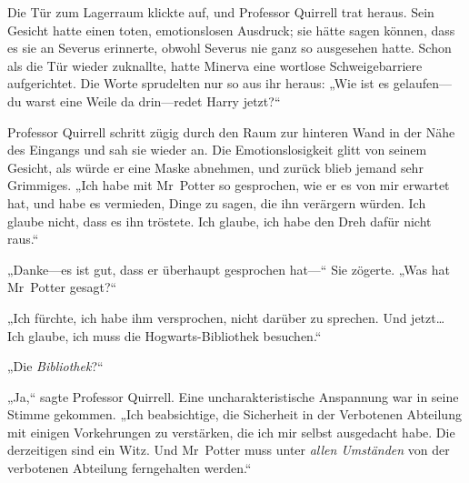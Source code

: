 \later


Die Tür zum Lagerraum klickte auf, und Professor Quirrell trat heraus. Sein Gesicht hatte einen toten, emotionslosen Ausdruck; sie hätte sagen können, dass es sie an Severus erinnerte, obwohl Severus nie ganz so ausgesehen hatte. Schon als die Tür wieder zuknallte, hatte Minerva eine wortlose Schweigebarriere aufgerichtet. Die Worte sprudelten nur so aus ihr heraus: „Wie ist es gelaufen—du warst eine Weile da drin—redet Harry jetzt?“

Professor Quirrell schritt zügig durch den Raum zur hinteren Wand in der Nähe des Eingangs und sah sie wieder an. Die Emotionslosigkeit glitt von seinem Gesicht, als würde er eine Maske abnehmen, und zurück blieb jemand sehr Grimmiges.
„Ich habe mit Mr~Potter so gesprochen, wie er es von mir erwartet hat, und habe es vermieden, Dinge zu sagen, die ihn verärgern würden. Ich glaube nicht, dass es ihn tröstete. Ich glaube, ich habe den Dreh dafür nicht raus.“

„Danke—es ist gut, dass er überhaupt gesprochen hat—“
Sie zögerte.
„Was hat Mr~Potter gesagt?“

„Ich fürchte, ich habe ihm versprochen, nicht darüber zu sprechen. Und jetzt… Ich glaube, ich muss die Hogwarts-Bibliothek besuchen.“

„Die \emph{Bibliothek}?“

„Ja,“ sagte Professor Quirrell.
Eine uncharakteristische Anspannung war in seine Stimme gekommen.
„Ich beabsichtige, die Sicherheit in der Verbotenen Abteilung mit einigen Vorkehrungen zu verstärken, die ich mir selbst ausgedacht habe. Die derzeitigen sind ein Witz. Und Mr~Potter muss unter \emph{allen Umständen} von der verbotenen Abteilung ferngehalten werden.“

